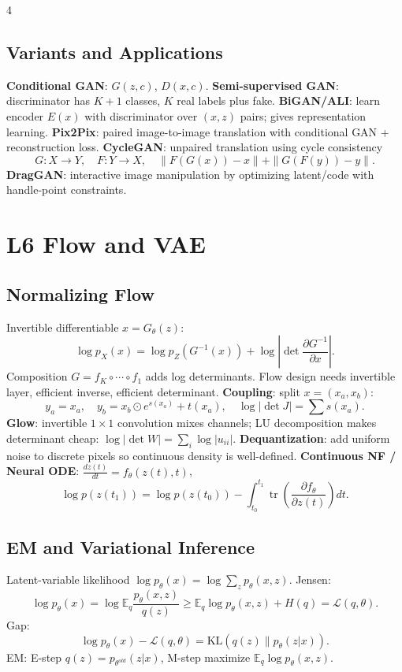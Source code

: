 \documentclass{article}
\newcommand{\key}[1]{\textbf{#1}}
\newcommand{\E}{\mathbb{E}}
\newcommand{\KL}{\mathrm{KL}}
\newcommand{\1}{\mathbf 1}
\DeclareMathOperator{\tr}{tr}
\begin{document}
\begin{multicols*}{4}
\subsection{Variants and Applications}
\key{Conditional GAN}: $G(z,c)$, $D(x,c)$. \key{Semi-supervised GAN}: discriminator has $K+1$ classes, $K$ real labels plus fake. \key{BiGAN/ALI}: learn encoder $E(x)$ with discriminator over $(x,z)$ pairs; gives representation learning. \key{Pix2Pix}: paired image-to-image translation with conditional GAN + reconstruction loss. \key{CycleGAN}: unpaired translation using cycle consistency
\[
G:X\to Y,\quad F:Y\to X,\quad \|F(G(x))-x\|+\|G(F(y))-y\|.
\]
\key{DragGAN}: interactive image manipulation by optimizing latent/code with handle-point constraints.

\section{L6 Flow and VAE}
\subsection{Normalizing Flow}
Invertible differentiable $x=G_\theta(z)$:
\[
\log p_X(x)=\log p_Z(G^{-1}(x))+\log\left|\det\frac{\partial G^{-1}}{\partial x}\right|.
\]
Composition $G=f_K\circ\cdots\circ f_1$ adds log determinants. Flow design needs invertible layer, efficient inverse, efficient determinant.
\key{Coupling}: split $x=(x_a,x_b)$:
\[
y_a=x_a,\quad y_b=x_b\odot e^{s(x_a)}+t(x_a),\quad
\log|\det J|=\sum s(x_a).
\]
\key{Glow}: invertible $1\times1$ convolution mixes channels; LU decomposition makes determinant cheap: $\log|\det W|=\sum_i\log|u_{ii}|$. \key{Dequantization}: add uniform noise to discrete pixels so continuous density is well-defined.
\key{Continuous NF / Neural ODE}: $\frac{dz(t)}{dt}=f_\theta(z(t),t)$,
\[
\log p(z(t_1))=\log p(z(t_0))-\int_{t_0}^{t_1}\tr\left(\frac{\partial f_\theta}{\partial z(t)}\right)dt.
\]

\subsection{EM and Variational Inference}
Latent-variable likelihood $\log p_\theta(x)=\log\sum_z p_\theta(x,z)$. Jensen:
\[
\log p_\theta(x)=\log\E_q\frac{p_\theta(x,z)}{q(z)}
\ge \E_q\log p_\theta(x,z)+H(q)=\mathcal L(q,\theta).
\]
Gap:
\[
\log p_\theta(x)-\mathcal L(q,\theta)=\KL(q(z)\|p_\theta(z|x)).
\]
EM: E-step $q(z)=p_{\theta^{old}}(z|x)$, M-step maximize $\E_q\log p_\theta(x,z)$.


\end{multicols*}
\end{document}
